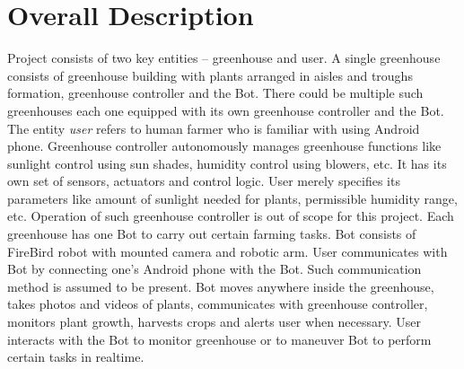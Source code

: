 \documentclass[a4paper, 12pt]{article}
\begin{document}
\section{Overall Description}
Project consists of two key entities -- greenhouse and user. A single greenhouse consists of greenhouse building with
plants arranged in aisles and troughs formation, greenhouse controller and the Bot. There could be multiple such 
greenhouses each one equipped with its own greenhouse controller and the Bot. The entity \emph{user} refers to human farmer 
who is familiar with using Android phone.
Greenhouse controller autonomously manages greenhouse functions like sunlight control using sun shades, humidity control using
blowers, etc. It has its own set of sensors, actuators and control logic. User merely specifies its parameters like
amount of sunlight needed for plants, permissible humidity range, etc. Operation of such greenhouse controller is out of scope for
this project.
Each greenhouse has one Bot to carry out certain farming tasks. Bot consists of FireBird robot with mounted camera and
robotic arm.
User communicates with Bot by connecting one's Android phone with the Bot.
Such communication method is assumed to be present.
Bot moves anywhere inside the greenhouse, takes photos and videos of plants, communicates with greenhouse 
controller, monitors plant growth, harvests crops and alerts user when necessary.
User interacts with the Bot to monitor greenhouse or to maneuver Bot to perform certain 
tasks in realtime.
\end{document}
